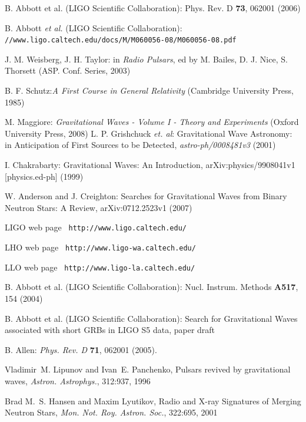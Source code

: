 \documentclass[epsf]{article}
\begin{document}
\begin{thebibliography}{99}

B. Abbott et al. (LIGO Scientific Collaboration): Phys. Rev. D {\bf 73}, 062001 (2006)

B. Abbott {\it et al.} (LIGO Scientific Collaboration): \verb|//www.ligo.caltech.edu/docs/M/M060056-08/M060056-08.pdf|

J. M. Weisberg, J. H. Taylor: in {\it Radio Pulsars}, ed by M. Bailes, D. J. Nice, S.  Thorsett (ASP. Conf.  Series, 2003)

B. F. Schutz:{\it A First Course in General Relativity} (Cambridge University Press, 1985)

M. Maggiore: {\it Gravitational Waves - Volume I - Theory and Experiments} (Oxford University Press, 2008)
L. P. Grishchuck {\it et. al}: Gravitational Wave Astronomy: in Anticipation of First Sources to be Detected, {\em astro-ph/0008481v3} (2001)

I. Chakrabarty: Gravitational Waves: An Introduction, arXiv:physics/9908041v1 [physics.ed-ph] (1999)

W. Anderson and J. Creighton: Searches for Gravitational Waves from Binary Neutron Stars: A Review, arXiv:0712.2523v1 (2007)

LIGO web page \verb| http://www.ligo.caltech.edu/|

LHO web page \verb| http://www.ligo-wa.caltech.edu/|

LLO web page \verb| http://www.ligo-la.caltech.edu/|

B. Abbott et al. (LIGO Scientiﬁc Collaboration): Nucl. Instrum.  Methods {\bf A517}, 154 (2004)

B. Abbott et al. (LIGO Scientiﬁc Collaboration): Search for Gravitational Waves associated with short GRBs in LIGO S5 data, paper draft

 B. Allen: {\em Phys. Rev. D} {\bf 71}, 062001 (2005).

Vladimir~M. Lipunov and Ivan~E. Panchenko, Pulsars revived by gravitational waves, {\em Astron. Astrophys.}, 312:937, 1996

Brad M.~S. Hansen and Maxim Lyutikov, Radio and X-ray Signatures of Merging Neutron Stars, {\em Mon. Not. Roy. Astron. Soc.}, 322:695, 2001



\end{thebibliography}
\end{document}
